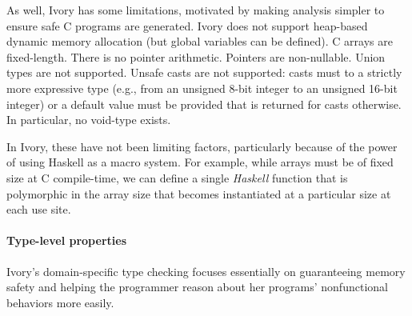As well, Ivory has some limitations, motivated by making analysis simpler to
ensure safe C programs are generated.  Ivory does not support heap-based dynamic
memory allocation (but global variables can be defined).  C arrays are
fixed-length.  There is no pointer arithmetic.  Pointers are non-nullable.
Union types are not supported.  Unsafe casts are not supported: casts must to a
strictly more expressive type (e.g., from an unsigned 8-bit integer to an
unsigned 16-bit integer) or a default value must be provided that is returned
for casts otherwise.  In particular, no void-type exists.

In Ivory, these have not been limiting factors, particularly because of the
power of using Haskell as a macro system.  For example, while arrays must be of
fixed size at C compile-time, we can define a single \emph{Haskell} function
that is polymorphic in the array size that becomes instantiated at a particular
size at each use site.  %


\paragraph{Type-level properties}
Ivory's domain-specific type checking focuses essentially on guaranteeing memory
safety and helping the programmer reason about her programs' nonfunctional
behaviors more easily.



